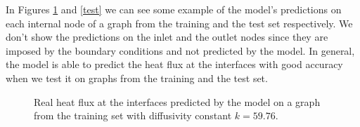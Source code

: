 \documentclass[11pt,a4paper]{article}
\begin{document}
In Figures \ref{train} and \ref{test} we can see some example of the model's predictions on each internal node of a graph from the training and the test set respectively. We don't show the predictions on the inlet and the outlet nodes since they are imposed by the boundary conditions and not predicted by the model.
In general, the model is able to predict the heat flux at the interfaces with good accuracy when we test it on graphs from the training and the test set. 

\begin{figure}[H]
    \centering
    \caption{Real heat flux at the interfaces predicted by the model on a graph from the training set with diffusivity constant \(k=59.76\).}
    \label{train}
\end{figure}
\end{document}
